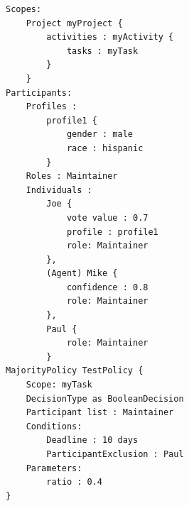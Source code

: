 
\begin{lstlisting}[caption=Simple governance policy evaluated following a majority strategy as a \texttt{BooleanDecision} requiring 40\% positive votes with a deadline of ten days., 
                    label=lst:example, 
                    basicstyle=\ttfamily\fontsize{8pt}{8.5pt}\selectfont,
                    breaklines=true,
                    float=t,
                    captionpos=b]
Scopes: 
    Project myProject {
        activities : myActivity {
            tasks : myTask
        }
    }
Participants:
    Profiles : 
        profile1 {
            gender : male
            race : hispanic
        }
    Roles : Maintainer
    Individuals : 
        Joe {
            vote value : 0.7
            profile : profile1
            role: Maintainer
        }, 
        (Agent) Mike {
            confidence : 0.8
            role: Maintainer
        },
        Paul {
            role: Maintainer
        }
MajorityPolicy TestPolicy {
    Scope: myTask
    DecisionType as BooleanDecision
    Participant list : Maintainer
    Conditions:
        Deadline : 10 days
        ParticipantExclusion : Paul
    Parameters:
        ratio : 0.4
}
\end{lstlisting}